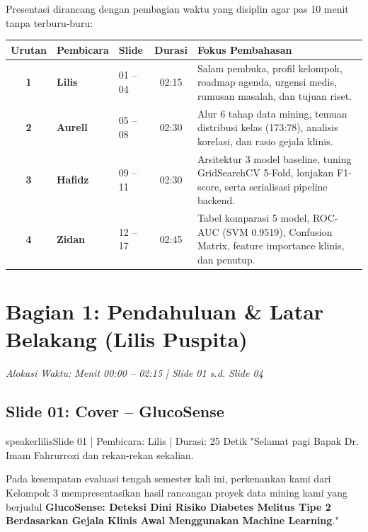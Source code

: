 \documentclass[11pt,a4paper]{article}
\begin{document}
Presentasi dirancang dengan pembagian waktu yang disiplin agar pas 10 menit tanpa terburu-buru:

\begin{center}
\small
\begin{tabularx}{\textwidth}{@{}cllcp{6.5cm}@{}}
    \toprule
    \textbf{Urutan} & \textbf{Pembicara} & \textbf{Slide} & \textbf{Durasi} & \textbf{Fokus Pembahasan} \\
    \midrule
    \textbf{1} & \textbf{Lilis} & 01 -- 04 & 02:15 & Salam pembuka, profil kelompok, roadmap agenda, urgensi medis, rumusan masalah, dan tujuan riset. \\
    \textbf{2} & \textbf{Aurell} & 05 -- 08 & 02:30 & Alur 6 tahap data mining, temuan distribusi kelas (173:78), analisis korelasi, dan rasio gejala klinis. \\
    \textbf{3} & \textbf{Hafidz} & 09 -- 11 & 02:30 & Arsitektur 3 model baseline, tuning GridSearchCV 5-Fold, lonjakan F1-score, serta serialisasi pipeline backend. \\
    \textbf{4} & \textbf{Zidan} & 12 -- 17 & 02:45 & Tabel komparasi 5 model, ROC-AUC (SVM 0.9519), Confusion Matrix, feature importance klinis, dan penutup. \\
    \bottomrule
\end{tabularx}
\end{center}

\vspace{0.2cm}

\section{Bagian 1: Pendahuluan \& Latar Belakang (Lilis Puspita)}
\textit{Alokasi Waktu: Menit 00:00 -- 02:15 | Slide 01 s.d. Slide 04}

\subsection{Slide 01: Cover -- GlucoSense}
\begin{scriptbox}{speakerlilis}{Slide 01 | Pembicara: Lilis | Durasi: 25 Detik}
"Selamat pagi Bapak Dr. Imam Fahrurrozi dan rekan-rekan sekalian. 

Pada kesempatan evaluasi tengah semester kali ini, perkenankan kami dari Kelompok 3 mempresentasikan hasil rancangan proyek data mining kami yang berjudul \textbf{GlucoSense: Deteksi Dini Risiko Diabetes Melitus Tipe 2 Berdasarkan Gejala Klinis Awal Menggunakan Machine Learning}."
\end{scriptbox}
\end{document}
